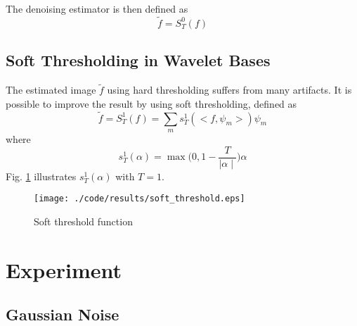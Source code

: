 \documentclass[journal,comsoc]{IEEEtran}
\begin{document}
The denoising estimator is then defined as
\begin{equation}
  \tilde{f}=S_T^0(f)
\end{equation}

\subsection{Soft Thresholding in Wavelet Bases}
\label{subsec:soft-thresholding-inwavelet-bases}

The estimated image $\tilde{f}$ using hard thresholding suffers from many artifacts.
It is possible to improve the result by using soft thresholding, defined as
\begin{equation}
  \tilde{f}=S_T^1(f)=\sum_ms_T^1(<f,\psi_m>)\psi_m
\end{equation}
where
\begin{equation}
  s_T^1(\alpha)=\max{(0,1-\frac{T}{\mid{\alpha}\mid}})\alpha
\end{equation}
Fig. \ref{fig:soft-threshold-function} illustrates $s_T^1{(\alpha)}$ with $T=1$.
\begin{figure}[!htb]
  \centering
  \texttt{[image: ./code/results/soft\_threshold.eps]}
  \caption{Soft threshold function}
  \label{fig:soft-threshold-function}    
\end{figure}


\section{Experiment}
\label{sec:experiment}

\subsection{Gaussian Noise}
\label{subsec:gaussian-noise}
\end{document}
